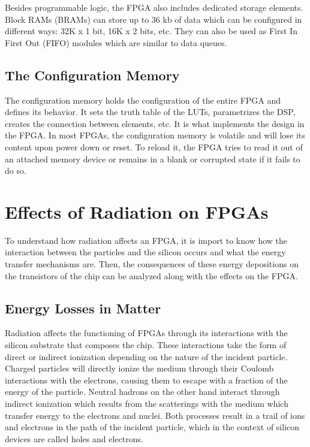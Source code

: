       Besides programmable logic, the FPGA also includes dedicated storage elements. Block RAMs (BRAMs) \cite{VIRTEX-RAM} can store up to 36 kb of data which can be configured in different ways: 32K x 1 bit, 16K x 2 bits, etc. They can also be used as First In First Out (FIFO) modules which are similar to data queues.

    \subsection{The Configuration Memory}

      The configuration memory holds the configuration of the entire FPGA and defines its behavior. It sets the truth table of the LUTs, parametrizes the DSP, creates the connection between elements, etc. It is what implements the design in the FPGA. In most FPGAs, the configuration memory is volatile and will lose its content upon power down or reset. To reload it, the FPGA tries to read it out of an attached memory device or remains in a blank or corrupted state if it fails to do so.

  \section{Effects of Radiation on FPGAs}

    To understand how radiation affects an FPGA, it is import to know how the interaction between the particles and the silicon occurs and what the energy transfer mechanisms are. Then, the consequences of these energy depositions on the transistors of the chip can be analyzed along with the effects on the FPGA.

    \subsection{Energy Losses in Matter}

      Radiation affects the functioning of FPGAs through its interactions with the silicon substrate that composes the chip. These interactions take the form of direct or indirect ionization depending on the nature of the incident particle. Charged particles will directly ionize the medium through their Coulomb interactions with the electrons, causing them to escape with a fraction of the energy of the particle. Neutral hadrons on the other hand interact through indirect ionization which results from the scatterings with the medium which transfer energy to the electrons and nuclei. Both processes result in a trail of ions and electrons in the path of the incident particle, which in the context of silicon devices are called holes and electrons. \\

